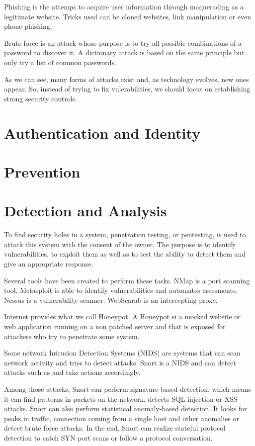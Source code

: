 Phishing is the attemps to acquire user information through maquerading as a
legitimate website. Tricks used can be cloned websites, link manipulation or
even phone phishing.

Brute force is an attack whose purpose is to try all possible combinations of
a password to discover it. A dictionary attack is based on the same principle
but only try a list of common passwords.

As we can see, many forms of attacks exist and, as technology evolves, new
ones appear. So, instead of trying to fix vulerabilities, we should focus on
establishing strong security controls.

\section{Authentication and Identity}

\section{Prevention}

\section{Detection and Analysis}
To find security holes in a system, penetration testing, or pentesting, is
used to attack this system with the consent of the owner. The purpose is to
identify vulnerabilities, to exploit them as well as to test the ability to
detect them and give an appropriate response.

Several tools have been created to perform these tasks. NMap is a port
scanning tool, Metasploit is able to identify vulnerabilities and automates
assesments. Nessus is a vulnerability scanner. WebScarab is an intercepting
proxy.

Internet provides what we call Honeypot. A Honeypot si a mocked website or web
application running on a non patched server and that is exposed for attackers
who try to penetrate some system.

Some network Intrusion Detection Systems (NIDS) are systems that can scan
network activity and tries to detect attacks. Snort is a NIDS and can detect
attacks such as and take actions accordingly.

Among those attacks, Snort can perform signature-based detection, which means
it can find patterns in packets on the network, detects SQL injection or XSS
attacks. Snort can also perform statistical anomaly-based detection. It looks
for peaks in traffic, connection coming from a single host and other anomalies
or detect brute force attacks. In the end, Snort can realize stateful protocol
detection to catch SYN port scans or follow a protocol conversation.

